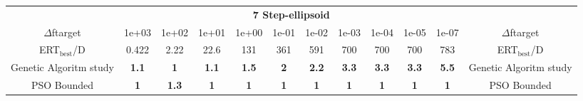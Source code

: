 \begin{tabular}{cccccccccccc}
 & \multicolumn{10}{c}{{\normalsize \textbf{7 Step-ellipsoid}}}\\
$\Delta$ftarget& 1e+03& 1e+02& 1e+01& 1e+00& 1e-01& 1e-02& 1e-03& 1e-04& 1e-05& 1e-07 & $\Delta$ftarget \\
ERT$_{\textrm{best}}$/D& 0.422& 2.22& 22.6& 131& 361& 591& 700& 700& 700& 783 & ERT$_{\textrm{best}}$/D \\
\hline
Genetic Algoritm study & \textbf{1.1} & \textbf{1} & \textbf{1.1} & \textbf{1.5} & \textbf{2} & \textbf{2.2} & \textbf{3.3} & \textbf{3.3} & \textbf{3.3} & \textbf{5.5} & Genetic Algoritm study \cite{add_an_entry_for_Genetic Algoritm study_in_bbob.bib}\\
PSO Bounded & \textbf{1} & \textbf{1.3} & \textbf{1} & \textbf{1} & \textbf{1} & \textbf{1} & \textbf{1} & \textbf{1} & \textbf{1} & \textbf{1} & PSO Bounded \cite{add_an_entry_for_PSO Bounded_in_bbob.bib}
\end{tabular}
